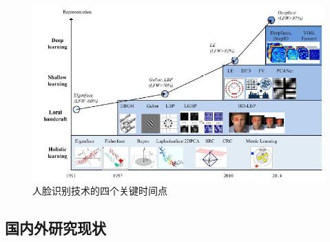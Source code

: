 \begin{figure}
    \centering
    \includegraphics[width=.75\textwidth]{figures/1maintime.jpg}
    \caption{人脸识别技术的四个关键时间点}
    \label{fig:maintime}
\end{figure}

\subsection{国内外研究现状}
